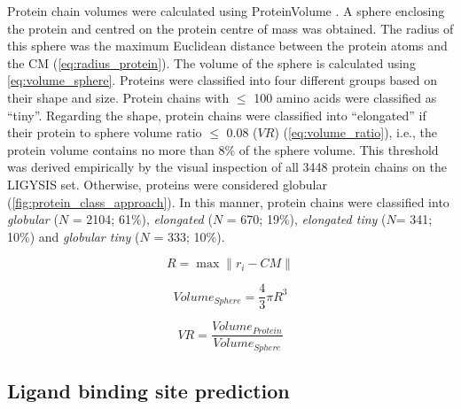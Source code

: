 Protein chain volumes were calculated using ProteinVolume \cite{CHEN_2015_PROTEINVOLUME}. A sphere enclosing the protein and centred on the protein centre of mass was obtained. The radius of this sphere was the maximum Euclidean distance between the protein atoms and the CM (\autoref{eq:radius_protein}). The volume of the sphere is calculated using \autoref{eq:volume_sphere}. Proteins were classified into four different groups based on their shape and size. Protein chains with $\leq$ 100 amino acids were classified as ``tiny''. Regarding the shape, protein chains were classified into ``elongated'' if their protein to sphere volume ratio $\leq$ 0.08 ($VR$) (\autoref{eq:volume_ratio}), i.e., the protein volume contains no more than 8\% of the sphere volume. This threshold was derived empirically by the visual inspection of all 3448 protein chains on the LIGYSIS set. Otherwise, proteins were considered globular (\autoref{fig:protein_class_approach}). In this manner, protein chains were classified into \textit{globular} ($N$ = 2104; 61\%), \textit{elongated} ($N$ = 670; 19\%), \textit{elongated tiny} ($N$= 341; 10\%) and \textit{globular tiny} ($N$ = 333; 10\%).

\begin{equation}
R = \max \| r_i - CM \|
\label{eq:radius_protein}
\end{equation}

\begin{equation}
Volume_{Sphere} = \frac{4}{3} \pi R^3
\label{eq:volume_sphere}
\end{equation}

\begin{equation}
VR = \frac{Volume_{Protein}}{Volume_{Sphere}}
\label{eq:volume_ratio}
\end{equation}

\FloatBarrier

\subsection{Ligand binding site prediction}

